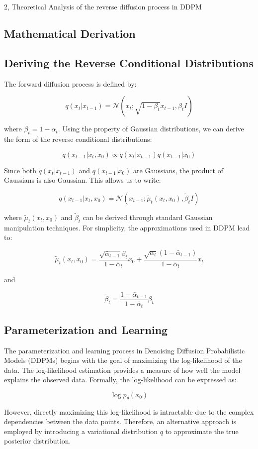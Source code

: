 \documentclass[10pt,a4paper]{article}
\begin{document}
\begin{task}{2,  Theoretical Analysis of the reverse diffusion process in DDPM}
\subsection{Mathematical Derivation}

\subsection*{Deriving the Reverse Conditional Distributions}

The forward diffusion process is defined by:

\[
q(x_t | x_{t-1}) = \mathcal{N}(x_t; \sqrt{1 - \beta_t} x_{t-1}, \beta_t I)
\]

where \( \beta_t = 1 - \alpha_t \). Using the property of Gaussian distributions, we can derive the form of the reverse conditional distributions:

\[
q(x_{t-1} | x_t, x_0) \propto q(x_t | x_{t-1}) q(x_{t-1} | x_0)
\]

Since both \( q(x_t | x_{t-1}) \) and \( q(x_{t-1} | x_0) \) are Gaussians, the product of Gaussians is also Gaussian. This allows us to write:

\[
q(x_{t-1} | x_t, x_0) = \mathcal{N}(x_{t-1}; \tilde{\mu}_t(x_t, x_0), \tilde{\beta}_t I)
\]

where \( \tilde{\mu}_t(x_t, x_0) \) and \( \tilde{\beta}_t \) can be derived through standard Gaussian manipulation techniques. For simplicity, the approximations used in DDPM lead to:

\[
\tilde{\mu}_t(x_t, x_0) = \frac{\sqrt{\bar{\alpha}_{t-1}} \beta_t}{1 - \bar{\alpha}_t} x_0 + \frac{\sqrt{\alpha_t}(1 - \bar{\alpha}_{t-1})}{1 - \bar{\alpha}_t} x_t
\]

and

\[
\tilde{\beta}_t = \frac{1 - \bar{\alpha}_{t-1}}{1 - \bar{\alpha}_t} \beta_t
\]

\subsection*{Parameterization and Learning}

The parameterization and learning process in Denoising Diffusion Probabilistic Models (DDPMs) begins with the goal of maximizing the log-likelihood of the data. The log-likelihood estimation provides a measure of how well the model explains the observed data. Formally, the log-likelihood can be expressed as:

\[
\log p_\theta(x_0)
\]

However, directly maximizing this log-likelihood is intractable due to the complex dependencies between the data points. Therefore, an alternative approach is employed by introducing a variational distribution \( q \) to approximate the true posterior distribution.


\end{task}
\end{document}
